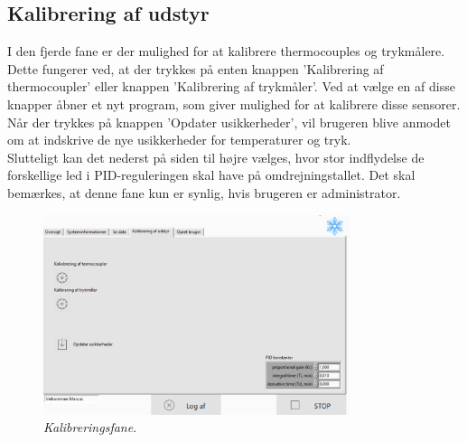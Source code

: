 \documentclass[../Hovedrapport.tex]{subfiles}
\begin{document}
\subsection*{Kalibrering af udstyr}
I den fjerde fane er der mulighed for at kalibrere thermocouples og trykmålere. Dette fungerer ved, at der trykkes på enten knappen 'Kalibrering af thermocoupler' eller knappen 'Kalibrering af trykmåler'. Ved at vælge en af disse knapper åbner et nyt program, som giver mulighed for at kalibrere disse sensorer. \\
Når der trykkes på knappen 'Opdater usikkerheder', vil brugeren blive anmodet om at indskrive de nye usikkerheder for temperaturer og tryk.\\
Slutteligt kan det nederst på siden til højre vælges, hvor stor indflydelse de forskellige led i PID-reguleringen skal have på omdrejningstallet.
Det skal bemærkes, at denne fane kun er synlig, hvis brugeren er administrator.
\begin{figure}[H]
	\centering
	\includegraphics[width=0.80\textwidth]{Billeder/kali.png}
	\caption{\textit{Kalibreringsfane}.}
	\label{fig:kalibrering}
\end{figure}
\end{document}
